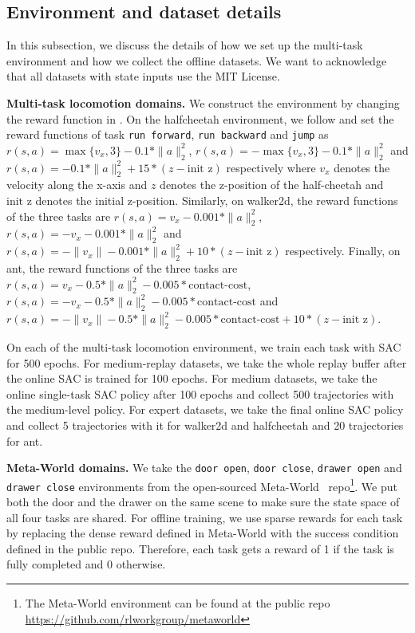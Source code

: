 \subsection{Environment and dataset details}
\label{app:env_data_details}

In this subsection, we discuss the details of how we set up the multi-task environment and how we collect the offline datasets. We want to acknowledge that all datasets with state inputs use the MIT License.

\textbf{Multi-task locomotion domains.} We construct the environment by changing the reward function in \citep{brockman2016openai}. On the halfcheetah environment, we follow \citep{yu2020mopo} and set the reward functions of task \texttt{run forward}, \texttt{run backward} and \texttt{jump} as $r(s, a) = \max\{v_x, 3\} - 0.1*\|a\|_2^2$, $r(s, a) = -\max\{v_x, 3\} - 0.1*\|a\|_2^2$ and $r(s, a) = - 0.1*\|a\|_2^2 + 15*(z - \text{init z})$ respectively where $v_x$ denotes the velocity along the x-axis and $z$ denotes the z-position of the half-cheetah and $\text{init z}$ denotes the initial z-position. Similarly, on walker2d, the reward functions of the three tasks are $r(s, a) = v_x - 0.001*\|a\|_2^2$, $r(s, a) = -v_x - 0.001*\|a\|_2^2$ and $r(s, a) = - \|v_x\| - 0.001*\|a\|_2^2 + 10*(z - \text{init z})$ respectively. Finally, on ant, the reward functions of the three tasks are $r(s, a) = v_x - 0.5*\|a\|_2^2 - 0.005*\text{contact-cost}$, $r(s, a) = -v_x - 0.5*\|a\|_2^2 - 0.005*\text{contact-cost}$ and $r(s, a) = - \|v_x\| - 0.5*\|a\|_2^2 - 0.005*\text{contact-cost} + 10*(z - \text{init z})$.

On each of the multi-task locomotion environment, we train each task with SAC~\citep{haarnoja2018soft} for 500 epochs. For medium-replay datasets, we take the whole replay buffer after the online SAC is trained for 100 epochs. For medium datasets, we take the online single-task SAC policy after 100 epochs and collect 500 trajectories with the medium-level policy. For expert datasets, we take the final online SAC policy and collect 5 trajectories with it for walker2d and halfcheetah and 20 trajectories for ant.

\textbf{Meta-World domains.} We take the \texttt{door open}, \texttt{door close}, \texttt{drawer open} and \texttt{drawer close} environments from the open-sourced Meta-World~\citep{yu2020metaworld} repo\footnote{The Meta-World environment can be found at the public repo \url{https://github.com/rlworkgroup/metaworld}}. We put both the door and the drawer on the same scene to make sure the state space of all four tasks are shared. For offline training, we use sparse rewards for each task by replacing the dense reward defined in Meta-World with the success condition defined in the public repo. Therefore, each task gets a reward of 1 if the task is fully completed and 0 otherwise.

